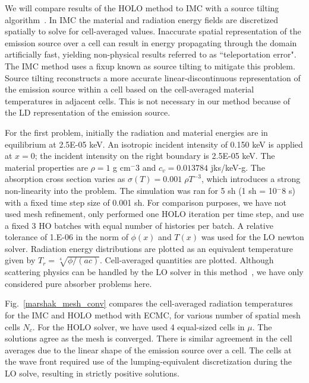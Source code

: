 \documentclass{mc2013}
\begin{document}


We will compare results of the HOLO method to IMC with
a source tilting algorithm~\cite{jayenne}. In IMC the material and radiation energy fields are discretized spatially to solve for cell-averaged values.
Inaccurate spatial representation of the emission source over a cell can result in
energy propagating through the domain artificially fast, yielding non-physical
results referred to as ``teleportation error".  The IMC method uses a fixup known as source tilting
to mitigate this problem.  Source tilting reconstructs a more accurate
linear-discontinuous representation of the
emission source within a cell based on the cell-averaged material temperatures in adjacent
cells. This is not necessary in our method because of the LD representation of the
emission source.  

For the first problem, initially the radiation and material energies are in
equilibrium at 2.5E-05 keV.   An isotropic incident intensity of 0.150 keV is applied
at $x=0$; the incident intensity on the right boundary is 2.5E-05 keV.
The material properties are $\rho = 1$ g cm$^-3$ and $c_v = 0.013784$ jks/keV-g. The
absorption cross section varies as $\sigma(T) = 0.001\;\rho T^{-3}$, which introduces
a strong non-linearity into the problem. The simulation was ran for 5 sh (1 sh =
10$^-8$ s) with a fixed time step size of 0.001 sh. For comparison purposes, we have not used mesh
refinement, only performed one HOLO iteration per time
step, and use a fixed 3 HO batches with equal number of histories per batch. A relative tolerance of 1.E-06 in the
norm of $\phi(x)$ and $T(x)$ was used for the LO newton solver. Radiation energy
distributions are plotted as an equivalent temperature given by
$T_r=\sqrt[4]{\phi/(ac)}$.  Cell-averaged quantities are plotted.
Although scattering physics
can be handled by the LO solver in this method~\cite{ans_2014}, we have only considered pure absorber
problems here.  


Fig.~\ref{marshak_mesh_conv} compares the cell-averaged radiation temperatures  for the
IMC and HOLO method with ECMC, for various number of spatial mesh cells $N_c$.  For the HOLO solver, we have used
4 equal-sized cells in $\mu$. The solutions agree as the mesh is converged.  There is similar agreement in the 
cell averages due to the linear shape of the emission source over a cell.  The cells
at the wave front required use of the lumping-equivalent discretization during the LO
solve, resulting in strictly positive solutions.
\end{document}

